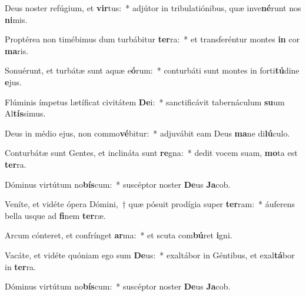 \item Deus noster refúgium, et \textbf{vir}tus:~* adjútor in tribulatiónibus, quæ inve\textbf{né}runt nos \textbf{ni}mis.
\item Proptérea non timébimus dum turbábitur \textbf{ter}ra:~* et transferéntur montes \textbf{in} cor \textbf{ma}ris.
\item Sonuérunt, et turbátæ sunt aquæ e\textbf{ó}rum:~* conturbáti sunt montes in forti\textbf{tú}dine \textbf{e}jus.
\item Flúminis ímpetus lætíficat civitátem \textbf{De}i:~* sanctificávit tabernáculum \textbf{su}um Al\textbf{tís}simus.
\item Deus in médio ejus, non commo\textbf{vé}bitur:~* adjuvábit eam Deus \textbf{ma}ne di\textbf{lú}culo.
\item Conturbátæ sunt Gentes, et inclináta sunt \textbf{re}gna:~* dedit vocem suam, \textbf{mo}ta est \textbf{ter}ra.
\item Dóminus virtútum no\textbf{bís}cum:~* suscéptor noster \textbf{De}us \textbf{Ja}cob.
\item Veníte, et vidéte ópera Dómini,~† quæ pósuit prodígia super \textbf{ter}ram:~* áuferens bella usque ad \textbf{fi}nem \textbf{ter}ræ.
\item Arcum cónteret, et confrínget \textbf{ar}ma:~* et scuta com\textbf{bú}ret \textbf{i}gni.
\item Vacáte, et vidéte quóniam ego sum \textbf{De}us:~* exaltábor in Géntibus, et exal\textbf{tá}bor in \textbf{ter}ra.
\item Dóminus virtútum no\textbf{bís}cum:~* suscéptor noster \textbf{De}us \textbf{Ja}cob.
